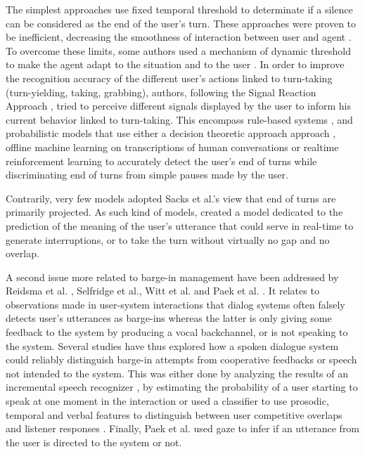 The simplest approaches use fixed temporal threshold to determinate if a silence can be considered as the end of the user's turn. These approaches were proven to be inefficient, decreasing the
smoothness of interaction between user and agent \citep{ward_root_2005}. To
overcome these limits, some authors used a mechanism
of dynamic threshold to make the agent adapt to the
situation and to the user \citep{bohus_decisions_2011,witt_modeling_2014}. In order to improve the recognition accuracy of the different user's actions linked to turn-taking (turn-yielding, taking, grabbing), authors, following the Signal Reaction Approach \citep{duncan_signals_1972}, tried to perceive different signals displayed by the user to inform his current behavior linked to turn-taking.   
This encompass rule-based systems \citep{cassell_embodiment_1999,thorisson_natural_2002}, and probabilistic
models that use either a decision theoretic approach
approach \citep{bohus_decisions_2011,raux_optimizing_2012}, offline machine learning on transcriptions of human conversations \citep{schlangen_reaction_2006,huang_multimodal_2011} or realtime reinforcement learning \citep{jonsdottir_distributed_2013} to accurately detect the user's end of turns while discriminating end of turns from simple pauses made by the user. 

Contrarily, very few models adopted Sacks et al.'s view that end of turns are primarily projected. As such kind of models, \citep{de_vault_incremental_2011} created a model dedicated to the prediction of the meaning of the user's utterance that could serve in real-time to generate interruptions, or to take the turn without virtually no gap and no overlap.

A second issue more related to barge-in management
have been addressed by Reidsma et al. \citep{reidsma_continuous_2011}, Selfridge et al.\citep{selfridge_continuously_2013}, Witt et al.\citep{witt_modeling_2014} and Paek et al. \citep{paek_continuous_2000}. It relates to observations
made in user-system interactions that dialog systems
often falsely detects user's utterances as barge-ins whereas
the latter is only giving some feedback to the system by
producing a vocal backchannel, or is not speaking to the
system. Several studies have thus explored how a spoken
dialogue system could reliably distinguish barge-in
attempts from cooperative feedbacks or speech not intended
to the system. This was either done by analyzing the results of an incremental speech recognizer \citep{selfridge_continuously_2013}, by estimating the probability of a user starting to speak at one moment in the interaction \citep{witt_modeling_2014} or used a classifier to use prosodic, temporal and verbal features to distinguish between user competitive overlaps and listener responses \citep{reidsma_continuous_2011}. Finally, Paek et al. \citep{paek_continuous_2000} used gaze to infer if an utterance from the user is directed to the system or not. 

